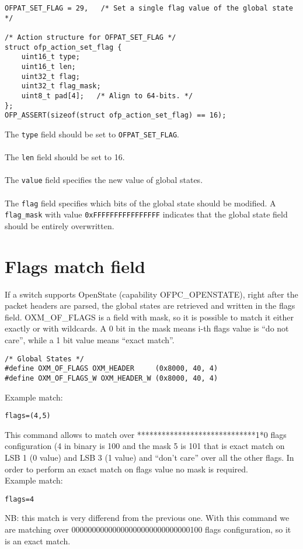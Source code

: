 \scriptsize\begin{verbatim}
OFPAT_SET_FLAG = 29,   /* Set a single flag value of the global state */

/* Action structure for OFPAT_SET_FLAG */
struct ofp_action_set_flag {
    uint16_t type;
    uint16_t len; 
    uint32_t flag;
    uint32_t flag_mask;   
    uint8_t pad[4];   /* Align to 64-bits. */
};
OFP_ASSERT(sizeof(struct ofp_action_set_flag) == 16);
\end{verbatim}\normalsize

\noindent
The \texttt{type} field should be set to \texttt{OFPAT\_SET\_FLAG}.
\\\\
The \texttt{len} field should be set to 16.
\\\\
The \texttt{value} field specifies the new value of global states.
\\\\
The \texttt{flag} field specifies which bits of the global state should be modified. A \texttt{flag\_mask} with value \texttt{0xFFFFFFFFFFFFFFFF} indicates that the global state field should be entirely overwritten.

\section{Flags match field}
\label{section:oxm_of_flags}

If a switch supports OpenState (capability OFPC\_OPENSTATE), right after the packet headers are parsed, the global states are retrieved and written in the flags field. OXM\_OF\_FLAGS is a field with mask, so it is possible to match it either exactly or with wildcards. A 0 bit in the mask means i-th flags value is ``do not care'', while a 1 bit value means ``exact match''.

\scriptsize\begin{verbatim}
/* Global States */
#define OXM_OF_FLAGS OXM_HEADER     (0x8000, 40, 4)
#define OXM_OF_FLAGS_W OXM_HEADER_W (0x8000, 40, 4)
\end{verbatim}\normalsize
Example match:
\scriptsize\begin{verbatim}
flags=(4,5)
\end{verbatim}\normalsize
This command allows to match over *****************************1*0 flags configuration (4 in binary is 100 and the mask 5 is 101 that is exact match on LSB 1 (0 value) and LSB 3 (1 value) and ``don’t care'' over all the other flags. In order to perform an exact match on flags value no mask is required.
\\Example match:
\scriptsize\begin{verbatim}
flags=4
\end{verbatim}\normalsize
NB: this match is very differend from the previous one. With this command we are matching over 00000000000000000000000000000100 flags configuration, so it is an exact match.

